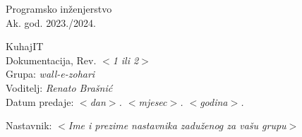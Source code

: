 \documentclass[12pt]{report}
\begin{document}
 
	
	
	
	\begin{titlepage}
		\begin{center}
			\LARGE Programsko inženjerstvo\\
			\large Ak. god. 2023./2024.\\
			
			
			\huge KuhajIT\\
			\Large Dokumentacija, Rev. \textit{$<$1 ili 2$>$}\\
			
			\normalsize
			Grupa: \textit{wall-e-zohari}\\
			Voditelj: \textit{Renato Brašnić}\\
			
			
			Datum predaje: \textit{$<$dan$>$. $<$mjesec$>$. $<$godina$>$.}\\
	
			
			Nastavnik: \textit{$<$Ime i prezime nastavnika zaduženog za vašu grupu$>$}\\
		
		\end{center}

	
	\end{titlepage}

	
	\tableofcontents


	
	
	
	
	
	
	
	
	
	\begingroup
	\renewcommand*\listfigurename{Indeks slika i dijagrama}
	\listoffigures
	\endgroup


	
	\eject 
		
	
\end{document}
